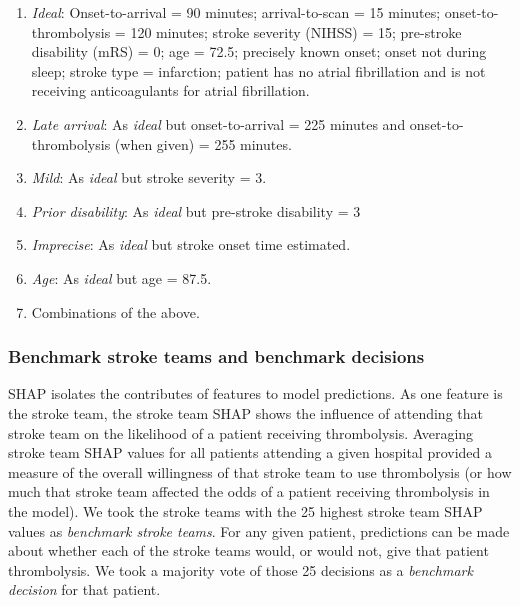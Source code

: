 \begin{enumerate}
    \item \textit{Ideal}: Onset-to-arrival = 90 minutes; arrival-to-scan = 15 minutes; onset-to-thrombolysis = 120 minutes; stroke severity (NIHSS) = 15; pre-stroke disability (mRS) = 0; age = 72.5; precisely known onset; onset not during sleep; stroke type = infarction; patient has no atrial fibrillation and is not receiving anticoagulants for atrial fibrillation.

    \item \textit{Late arrival}: As \textit{ideal} but onset-to-arrival = 225 minutes and onset-to-thrombolysis (when given) = 255 minutes.

    \item \textit{Mild}: As \textit{ideal} but stroke severity = 3.

    \item \textit{Prior disability}: As \textit{ideal} but pre-stroke disability = 3

    \item \textit{Imprecise}: As \textit{ideal} but stroke onset time estimated.

    \item \textit{Age}: As \textit{ideal} but age = 87.5.

    \item Combinations of the above.
\end{enumerate}

\subsubsection{Benchmark stroke teams and benchmark decisions}

SHAP isolates the contributes of features to model predictions. As one feature is the stroke team, the stroke team SHAP shows the influence of attending that stroke team on the likelihood of a patient receiving thrombolysis. Averaging stroke team SHAP values for all patients attending a given hospital provided a measure of the overall willingness of that stroke team to use thrombolysis (or how much that stroke team affected the odds of a patient receiving thrombolysis in the model). We took the stroke teams with the 25 highest stroke team SHAP values as \textit{benchmark stroke teams}. For any given patient, predictions can be made about whether each of the stroke teams would, or would not, give that patient thrombolysis. We took a majority vote of those 25 decisions as a \textit{benchmark decision} for that patient.

